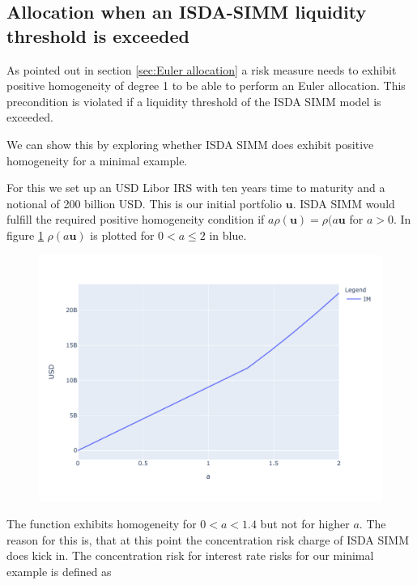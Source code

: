 \documentclass[../Thesis_AHoecherl.tex]{subfiles}
\begin{document}
    \subsection{Allocation when an ISDA-SIMM liquidity threshold is exceeded\label{sec:Allocation when an ISDA-SIMM liquidity threshold is exceeded}}
    
    As pointed out in section \ref{sec:Euler allocation} a risk measure needs to exhibit positive homogeneity of degree 1 to be able to perform an Euler allocation.
    This precondition is violated if a liquidity threshold of the ISDA SIMM model is exceeded.

    We can show this by exploring whether ISDA SIMM does exhibit positive homogeneity for a minimal example.
    
    For this we set up an USD Libor IRS with ten years time to maturity and a notional of 200 billion USD. This is our initial portfolio $\mathbf{u}$. ISDA SIMM would fulfill the required positive homogeneity condition if $a \rho(\mathbf{u}) = \rho(a \mathbf{u}$ for $a>0$. In figure \ref{fig:homogeneity of ISDA SIMM} $\rho(a\mathbf{u})$ is plotted for $0<a\leq 2$ in blue. 
    \begin{figure}
        \centering
        \includegraphics{Graphics/ISDA_SIMM_homogenity.pdf}
        \caption{}
        \label{fig:homogeneity of ISDA SIMM}
    \end{figure}
    The function exhibits homogeneity for $0<a<1.4$  but not for higher $a$. 
    The reason for this is, that at this point the concentration risk charge of ISDA SIMM does kick in.
    The concentration risk for interest rate risks for our minimal example is defined as \cite[Article 7.b]{SIMM}
\end{document}
